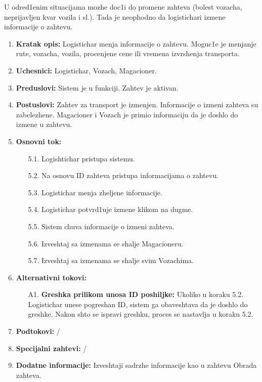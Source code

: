 
U odred1enim situacijama mozhe doc1i do promene zahteva (bolest vozacha, neprijavljen kvar vozila i sl.). Tada je neophodno da logistichari izmene informacije o zahtevu.

\begin{enumerate}
    \item \textbf{Kratak opis:} Logistichar menja informacije o zahtevu. Moguc1e je menjanje rute, vozacha, vozila, procenjene cene ili vremena izvrshenja transporta. 
    
    \item \textbf{Uchesnici:} Logistichar, Vozach, Magacioner.
    \item \textbf{Preduslovi:} Sistem je u funkciji. Zahtev je aktivan.
    \item \textbf{Postuslovi:} Zahtev za transport je izmenjen. Informacije o izmeni zahteva su zabelezhene. Magacioner i Vozach je primio informaciju da je doshlo do izmene u zahtevu.
    \item \textbf{Osnovni tok:}
        \begin{enumerate}
            \item[5.1.] Logishtichar pristupa sistemu. 
            \item[5.2.] Na osnovu ID zahteva pristupa informacijama o zahtevu.
            
            \item[5.3.] Logistichar menja zheljene informacije. 
            \item[5.4.] Logistichar potvrd1uje izmene klikom na dugme.
            
            \item[5.5.] Sistem chuva informacije o izmeni zahteva.
            \item[5.6.] Izveshtaj sa izmenama se shalje Magacioneru.
            \item[5.7.] Izveshtaj sa izmenama se shalje svim Vozachima.
            
        \end{enumerate}
    \item \textbf{Alternativni tokovi:}
            \begin{enumerate}
                \item [A1.] \textbf{Greshka prilikom unosa ID poshiljke: }
                Ukoliko u koraku 5.2. Logistichar unese pogreshan ID, sistem ga obaveshtava da je doshlo do greshke. 
                Nakon shto se ispravi greshku, proces se nastavlja u koraku 5.2.
            \end{enumerate}
        
    \item \textbf{Podtokovi:} /
    \item \textbf{Specijalni zahtevi:} /
    \item \textbf{Dodatne informacije:} Izveshtaji sadrzhe informacije kao u zahtevu Obrada zahteva.
    
\end{enumerate}



